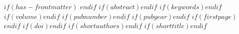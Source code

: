 $if(has-frontmatter)$
\frontmatter
$endif$
$if(abstract)$$endif$
$if(keywords)$$endif$
$if(volume)$$endif$
$if(pubnumber)$$endif$
$if(pubyear)$$endif$
$if(firstpage)$$endif$
$if(doi)$$endif$
$if(shortauthors)$$endif$
$if(shorttitle)$$endif$

\maketitle

